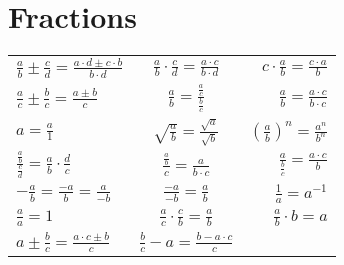 \section{Fractions}
\begin{center}
    \begin{longtable}{lcr}
        $\frac{a}{b} \pm \frac{c}{d} = \frac{a \cdot d \pm c \cdot b}{b \cdot d}$
        &
        $\frac{a}{b} \cdot \frac{c}{d} = \frac{a \cdot c}{b \cdot d}$
        &
        $c \cdot \frac{a}{b} = \frac{c \cdot a}{b}$
        \\
        $\frac{a}{c} \pm \frac{b}{c} = \frac{a \pm b}{c}$
        &
        $\frac{a}{b} = \frac{\frac{a}{c}}{\frac{b}{c}}$
        &
        $\frac{a}{b} = \frac{a \cdot c}{b \cdot c}$
        \\
        $a = \frac{a}{1}$
        &
        $\sqrt{\frac{a}{b}} = \frac{\sqrt{a}}{\sqrt{b}}$
        &
        $\left(\frac{a}{b}\right)^n = \frac{a^n}{b^n}$
        \\
        $\frac{\frac{a}{b}}{\frac{c}{d}} = \frac{a}{b} \cdot \frac{d}{c}$
        &
        $\frac{\frac{a}{b}}{c} = \frac{a}{b \cdot c}$
        &
        $\frac{a}{\frac{b}{c}} = \frac{a \cdot c}{b}$
        \\
        $-\frac{a}{b} = \frac{-a}{b} = \frac{a}{-b}$
        &
        $\frac{-a}{-b} = \frac{a}{b}$
        &
        $\frac{1}{a} = a^{-1}$
        \\
        $\frac{a}{a} = 1$
        &
        $\frac{a}{c} \cdot \frac{c}{b} = \frac{a}{b}$
        &
        $\frac{a}{b} \cdot b = a$
        \\
        $a \pm \frac{b}{c} = \frac{a \cdot c \pm b}{c}$
        &
        $\frac{b}{c} - a = \frac{b - a \cdot c}{c}$
    \end{longtable}
\end{center}
